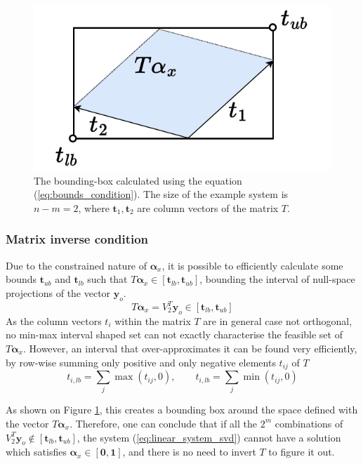\begin{figure}
\vspace{-1.4cm}
    \centering
    \includegraphics[width=\linewidth]{Papers/images/matrix_condition.pdf}
    \caption{The bounding-box calculated using the equation (\ref{eq:bounds_condition}). The size of the example system is $n\!-\!m\!=\!2$, where $\bm{t}_1,\bm{t}_2$ are column vectors of the matrix $T$.}
    \label{fig:matrix_condition}
\end{figure}

\subsubsection{Matrix inverse condition}
Due to the constrained nature of $\bm{\alpha}_x$, it is possible to efficiently calculate some bounds ${\bm{t}_{ub}}$ and $\bm{t}_{lb}$ such that $T\bm{\alpha}_x  \in [\bm{t}_{lb}, \bm{t}_{ub}]$, bounding the interval of null-space projections of the vector $\bm{y}_o$.
\begin{equation}
    T\bm{\alpha}_x  = V_2^T\bm{y}_o \in [\bm{t}_{lb}, \bm{t}_{ub}]\label{eq:necesassry_condition}
\end{equation}
As the column vectors $t_i$ within the matrix $T$ are in general case not orthogonal, no min-max interval shaped set can not exactly characterise the feasible set of $T\bm{\alpha}_x$. However, an interval that over-approximates it can be found very efficiently, by row-wise summing only positive and only negative elements $t_{ij}$ of  $T$
\begin{equation}
t_{i,lb} = \sum_j \max(t_{ij}, 0), \qquad
t_{i,lb} = \sum_j \min(t_{ij}, 0) 
\label{eq:bounds_condition}
\end{equation}

As shown on Figure \ref{fig:matrix_condition}, this creates a bounding box around the space defined with the vector $T\bm{\alpha}_x$. Therefore, one can conclude that if all the $2^m$ combinations of $V_2^T\bm{y}_o \notin [\bm{t}_{lb}, \bm{t}_{ub}] $, the system (\ref{eq:linear_system_svd}) cannot have a solution which satisfies $\bm{\alpha}_x \in [\bm{0},\bm{1}]$, and there is no need to invert $T$ to figure it out.

